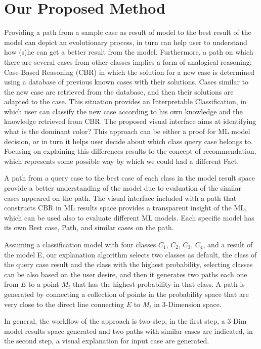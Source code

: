 \documentclass{llncs}
\begin{document}
\section{Our Proposed Method}
Providing a path from a sample case as result of model to the best result of the model can depict an evolutionary process, in turn can help user to understand how (s)he can get a better result from the model. 
Furthermore, a path on which there are several cases from other classes implies a form of analogical reasoning: Case-Based Reasoning (CBR) in which the solution for a new case is determined using a database of previous known cases with their solutions.
Cases similar to the new case are retrieved from the database, and then their solutions are adapted to the case. 
This situation provides an Interpretable Classification, in which user can classify the new case according to his own knowledge and the knowledge retrieved from CBR. The proposed visual interface aims at identifying what is the dominant color? This approach can be either a proof for ML model decision, or in turn it helps user decide about which class query case belongs to. Focusing on explaining this differences results to the concept of recommendation, which represents some possible way by which we could had a different Fact.

A path from a query case to the best case of each class in the model result space provide a better understanding of the model due to evaluation of the similar cases appeared on the path. The visual interface included with a path that constructs CBR in ML results space provides a transparent insight of the ML, which can be used also to evaluate different ML models. Each specific model has its own Best case, Path, and similar cases on the path. 

Assuming a classification model with four classes $C_{1}$, $C_{2}$, $C_{3}$, $C_{4}$, and a result of the model E, our explanation algorithm selects two classes as default, the class of the query case result and the class with the highest probability, selecting classes can be also based on the user desire, and then it generates two paths each one from $E$ to a point $M_{i}$ that has the highest probability in that class. A path is generated by connecting a collection of points in the probability space that are very close to the direct line connecting $E$ to $M_{i}$ in 3-Dimension space.

In general, the workflow of the approach is two-step, in the first step, a 3-Dim model results space generated and two paths with similar cases are indicated, in the second step, a visual explanation for input case are generated.
\end{document}
